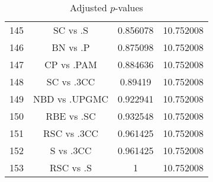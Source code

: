 \documentclass[a4paper,10pt]{article}
\begin{document}
\begin{landscape}
\begin{table}[!htp]
\begin{tabular}{cccc}
145&SC vs .S&0.856078&10.752008\\
146&BN vs .P&0.875098&10.752008\\
147&CP vs .PAM&0.884636&10.752008\\
148&SC vs .3CC&0.89419&10.752008\\
149&NBD vs .UPGMC&0.922941&10.752008\\
150&RBE vs .SC&0.932548&10.752008\\
151&RSC vs .3CC&0.961425&10.752008\\
152&S vs .3CC&0.961425&10.752008\\
153&RSC vs .S&1&10.752008\\
\hline
\end{tabular}
\caption{Adjusted $p$-values}
\end{table}

\end{landscape}
\end{document}

